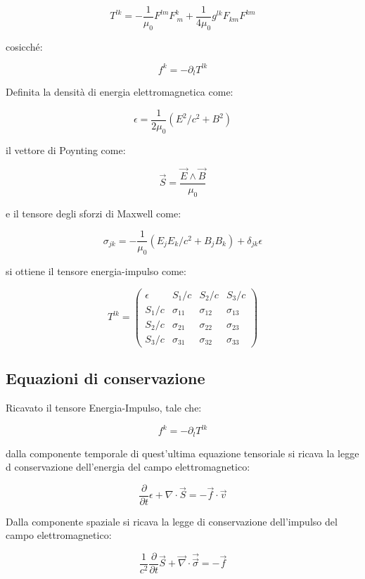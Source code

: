 \documentclass{article}
\begin{document}
\begin{equation}
    T^{lk}=-\frac{1}{\mu_0}F^{lm}F^k_{\ m}+\frac{1}{4\mu_0}g^{lk}F_{km}F^{km}
\end{equation}

cosicché:

\begin{equation}
    f^k=-\partial_l T^{lk}
\end{equation}

Definita la densità di energia elettromagnetica come:

\begin{equation}
    \epsilon=\frac{1}{2\mu_0}(E^2/c^2+B^2)
\end{equation}

il vettore di Poynting come:

\begin{equation}
    \vec{S}=\frac{\vec{E}\wedge\vec{B}}{\mu_0}
\end{equation}

e il tensore degli sforzi di Maxwell come:

\begin{equation}
    \sigma_{jk}=-\frac{1}{\mu_0}(E_jE_k/c^2+B_jB_k)+\delta_{jk}\epsilon
\end{equation}

si ottiene il tensore energia-impulso come:

\begin{equation}
    T^{lk}=
    \begin{pmatrix}
        \epsilon & S_1/c       & S_2/c       & S_3/c       \\
        S_1/c    & \sigma_{11} & \sigma_{12} & \sigma_{13} \\
        S_2/c    & \sigma_{21} & \sigma_{22} & \sigma_{23} \\
        S_3/c    & \sigma_{31} & \sigma_{32} & \sigma_{33}
    \end{pmatrix}
\end{equation}

\subsection{Equazioni di conservazione}
Ricavato il tensore Energia-Impulso, tale che:

\begin{equation}
    f^k=-\partial_l T^{lk}
\end{equation}

dalla componente temporale di quest'ultima equazione tensoriale si ricava la legge d conservazione dell'energia del campo elettromagnetico:

\begin{equation}
    \frac{\partial}{\partial t}\epsilon + \nabla \cdot \vec{S} = -\vec{f} \cdot \vec{v}
\end{equation}

Dalla componente spaziale si ricava la legge di conservazione dell'impulso del campo elettromagnetico:

\begin{equation}
    \frac{1}{c^2} \frac{\partial}{\partial t} \vec{S} + \vec{\nabla} \cdot \vec{\vec{\sigma}} = -\vec{f}
\end{equation}
\end{document}
